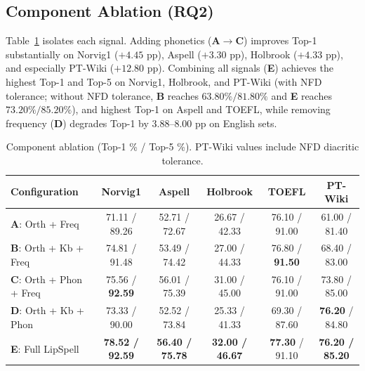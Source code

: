 \documentclass[11pt,a4paper]{article}
\begin{document}
\subsection{Component Ablation (RQ2)}
Table~\ref{tab:comp_ablation} isolates each signal. Adding phonetics (\textbf{A}$\rightarrow$\textbf{C}) improves Top-1 substantially on Norvig1 ($+4.45$ pp), Aspell ($+3.30$ pp), Holbrook ($+4.33$ pp), and especially PT-Wiki ($+12.80$ pp). Combining all signals (\textbf{E}) achieves the highest Top-1 and Top-5 on Norvig1, Holbrook, and PT-Wiki (with NFD tolerance; without NFD tolerance, \textbf{B} reaches $63.80\% / 81.80\%$ and \textbf{E} reaches $73.20\% / 85.20\%$), and highest Top-1 on Aspell and TOEFL, while removing frequency (\textbf{D}) degrades Top-1 by $3.88$--$8.00$ pp on English sets.

\begin{table}[ht]
\centering
\scriptsize
\setlength{\tabcolsep}{3.5pt}
\caption{Component ablation (Top-1 \% / Top-5 \%). PT-Wiki values include NFD diacritic tolerance.}
\label{tab:comp_ablation}
\begin{tabular}{lccccc}
\toprule
Configuration & Norvig1 & Aspell & Holbrook & TOEFL & PT-Wiki \\
\midrule
\textbf{A}: Orth + Freq              & 71.11 / 89.26 & 52.71 / 72.67 & 26.67 / 42.33 & 76.10 / 91.00 & 61.00 / 81.40 \\
\textbf{B}: Orth + Kb + Freq         & 74.81 / 91.48 & 53.49 / 74.42 & 27.00 / 44.33 & 76.80 / \textbf{91.50} & 68.40 / 83.00 \\
\textbf{C}: Orth + Phon + Freq       & 75.56 / \textbf{92.59} & 56.01 / 75.39 & 31.00 / 45.00 & 76.10 / 91.00 & 73.80 / 85.00 \\
\textbf{D}: Orth + Kb + Phon         & 73.33 / 90.00 & 52.52 / 73.84 & 25.33 / 41.33 & 69.30 / 87.60 & \textbf{76.20} / 84.80 \\
\textbf{E}: Full LipSpell            & \textbf{78.52 / 92.59} & \textbf{56.40 / 75.78} & \textbf{32.00 / 46.67} & \textbf{77.30} / 91.10 & \textbf{76.20 / 85.20} \\
\bottomrule
\end{tabular}
\end{table}
\end{document}
